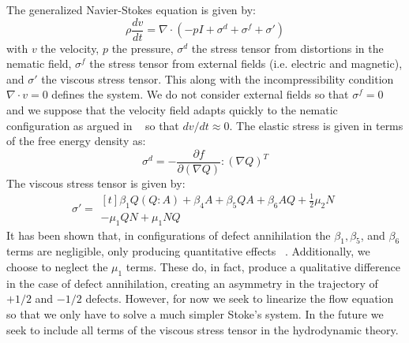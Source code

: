 \documentclass[reqno]{article}
\begin{document}
  The generalized Navier-Stokes equation is given by:
  \begin{equation} \label{eq:generalized-navier-stokes}
    \rho \frac{dv}{dt}
    =
    \nabla \cdot \left(
      -p I
      + \sigma^d
      + \sigma^f
      + \sigma'
    \right)
  \end{equation}
  with $v$ the velocity, $p$ the pressure, $\sigma^d$ the stress tensor from
  distortions in the nematic field,
  $\sigma^f$ the stress tensor from external fields (i.e. electric and
  magnetic), and $\sigma'$ the viscous stress tensor.
  This along with the incompressibility condition $\nabla \cdot v = 0$ defines
  the system.
  We do not consider external fields so that $\sigma^f = 0$ and we suppose that
  the velocity field adapts quickly to the nematic configuration as argued in
  ~\cite{svensek_complex_2002} so that $dv/dt \approx 0$.
  The elastic stress is given in terms of the free energy density as:
  \begin{equation}
    \sigma^d
    =
    - \frac{\partial f}{\partial (\nabla Q)} : \left( \nabla Q \right)^T
  \end{equation}
  The viscous stress tensor is given by:
  \begin{equation} \label{eq:viscous-stress-tensor}
    \sigma'
    =
    \begin{multlined}[t]
      \beta_1 Q \left( Q : A \right)
      + \beta_4 A
      + \beta_5 QA
      + \beta_6 AQ
      + \frac12 \mu_2 N \\
      - \mu_1 QN + \mu_1 NQ
    \end{multlined}
  \end{equation}
  It has been shown that, in configurations of defect annihilation the $\beta_1,
  \beta_5$, and $\beta_6$ terms are negligible, only producing quantitative
  effects ~\cite{svensek_hydrodynamics_2002}.
  Additionally, we choose to neglect the $\mu_1$ terms.
  These do, in fact, produce a qualitative difference in the case of defect
  annihilation, creating an asymmetry in the trajectory of $+1/2$ and $-1/2$
  defects.
  However, for now we seek to linearize the flow equation so that we only have
  to solve a much simpler Stoke's system.
  In the future we seek to include all terms of the viscous stress tensor in the
  hydrodynamic theory.
\end{document}
